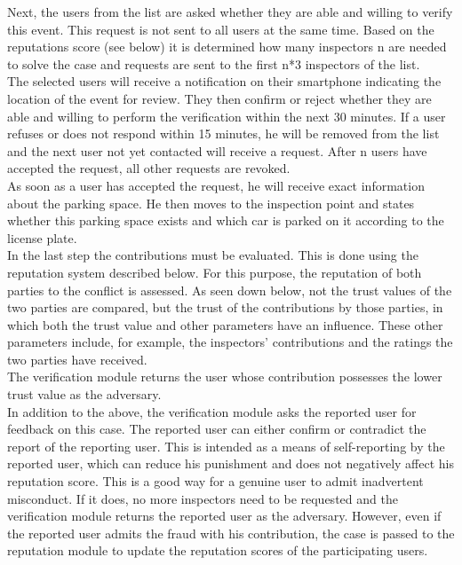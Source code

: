 \documentclass[
a4paper,     %
titlepage,   %
14pt         %
]{scrartcl}  %
\theoremstyle{mystyle}
\begin{document}
Next, the users from the list are asked whether they are able and willing to verify this event. This request is not sent to all users at the same time. Based on the reputations score (see below) it is determined how many inspectors n are needed to solve the case and requests are sent to the first n*3 inspectors of the list.\\

The selected users will receive a notification on their smartphone indicating the location of the event for review. They then confirm or reject whether they are able and willing to perform the verification within the next 30 minutes. If a user refuses or does not respond within 15 minutes, he will be removed from the list and the next user not yet contacted will receive a request. After n users have accepted the request, all other requests are revoked.\\

As soon as a user has accepted the request, he will receive exact information about the parking space. He then moves to the inspection point and states whether this parking space exists and which car is parked on it according to the license plate.\\

In the last step the contributions must be evaluated. This is done using the reputation system described below. For this purpose, the reputation of both parties to the conflict is assessed. As seen down below, not the trust values of the two parties are compared, but the trust of the contributions by those parties, in which both the trust value and other parameters have an influence. These other parameters include, for example, the inspectors' contributions and the ratings the two parties have received. \\

The verification module returns the user whose contribution possesses the lower trust value as the adversary. \\

In addition to the above, the verification module asks the reported user for feedback on this case. The reported user can either confirm or contradict the report of the reporting user. This is intended as a means of self-reporting by the reported user, which can reduce his punishment and does not negatively affect his reputation score. This is a good way for a genuine user to admit inadvertent misconduct. If it does, no more inspectors need to be requested and the verification module returns the reported user as the adversary. However, even if the reported user admits the fraud with his contribution, the case is passed to the reputation module to update the reputation scores of the participating users.
\end{document}

